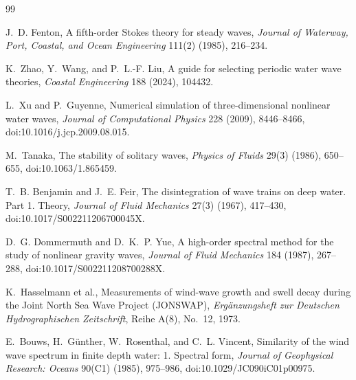 \documentclass[10pt]{article}
\begin{document}
{\footnotesize
\begin{thebibliography}{99}
\setlength{\itemsep}{0pt}

J.~D. Fenton,
\newblock A fifth-order Stokes theory for steady waves,
\newblock \emph{Journal of Waterway, Port, Coastal, and Ocean Engineering}
111(2) (1985), 216--234.

K.~Zhao, Y.~Wang, and P.~L.-F. Liu,
\newblock A guide for selecting periodic water wave theories,
\newblock \emph{Coastal Engineering} 188 (2024), 104432.

L.~Xu and P.~Guyenne,
\newblock Numerical simulation of three-dimensional nonlinear water waves,
\newblock \emph{Journal of Computational Physics} 228 (2009), 8446--8466,
\newblock doi:10.1016/j.jcp.2009.08.015.

M.~Tanaka,
\newblock The stability of solitary waves,
\newblock \emph{Physics of Fluids} 29(3) (1986), 650--655,
\newblock doi:10.1063/1.865459.

T.~B. Benjamin and J.~E. Feir,
\newblock The disintegration of wave trains on deep water. Part 1. Theory,
\newblock \emph{Journal of Fluid Mechanics} 27(3) (1967), 417--430,
\newblock doi:10.1017/S002211206700045X.

D.~G. Dommermuth and D.~K.~P. Yue,
\newblock A high-order spectral method for the study of nonlinear gravity
waves,
\newblock \emph{Journal of Fluid Mechanics} 184 (1987), 267--288,
\newblock doi:10.1017/S002211208700288X.

K.~Hasselmann et al.,
\newblock Measurements of wind-wave growth and swell decay during the Joint
North Sea Wave Project (JONSWAP),
\newblock \emph{Erg\"anzungsheft zur Deutschen Hydrographischen Zeitschrift},
Reihe A(8), No.~12, 1973.

E.~Bouws, H.~G\"unther, W.~Rosenthal, and C.~L. Vincent,
\newblock Similarity of the wind wave spectrum in finite depth water:
1. Spectral form,
\newblock \emph{Journal of Geophysical Research: Oceans} 90(C1) (1985),
975--986,
\newblock doi:10.1029/JC090iC01p00975.

\end{thebibliography}
}
\end{document}
